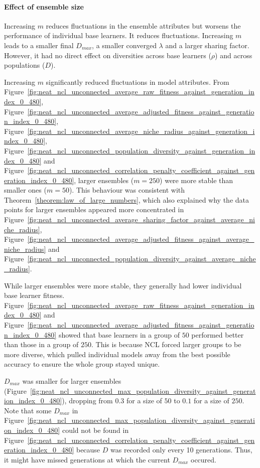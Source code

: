 \paragraph{Effect of ensemble size}
Increasing $m$ reduces fluctuations in the ensemble attributes but worsens the performance of individual base learners. It reduces fluctuations. Increasing $m$ leads to a smaller final $D_{max}$, a smaller converged $\lambda$ and a larger sharing factor. However, it had no direct effect on diversities across base learners ($\rho$) and across populations ($D$). 

Increasing $m$ significantly reduced fluctuations in model attributes. From Figure~\ref{fig:neat_ncl_unconnected_average_raw_fitness_against_generation_index_0_480}, Figure~\ref{fig:neat_ncl_unconnected_average_adjusted_fitness_against_generation_index_0_480}, Figure~\ref{fig:neat_ncl_unconnected_average_niche_radius_against_generation_index_0_480}, Figure~\ref{fig:neat_ncl_unconnected_population_diversity_against_generation_index_0_480} and Figure~\ref{fig:neat_ncl_unconnected_correlation_penalty_coefficient_against_generation_index_0_480}, larger ensembles ($m = 250$) were more stable than smaller ones ($m = 50$). This behaviour was consistent with Theorem~\ref{theorem:law_of_large_numbers}, which also explained why the data points for larger ensembles appeared more concentrated in Figure~\ref{fig:neat_ncl_unconnected_average_sharing_factor_against_average_niche_radius}, Figure~\ref{fig:neat_ncl_unconnected_average_adjusted_fitness_against_average_niche_radius} and Figure~\ref{fig:neat_ncl_unconnected_population_diversity_against_average_niche_radius}. 

While larger ensembles were more stable, they generally had lower individual base learner fitness. Figure~\ref{fig:neat_ncl_unconnected_average_raw_fitness_against_generation_index_0_480} and Figure~\ref{fig:neat_ncl_unconnected_average_adjusted_fitness_against_generation_index_0_480} showed that base learners in a group of $50$ performed better than those in a group of $250$. This is because NCL forced larger groups to be more diverse, which pulled individual models away from the best possible accuracy to ensure the whole group stayed unique. 

$D_{max}$ was smaller for larger ensembles (Figure~\ref{fig:neat_ncl_unconnected_max_population_diversity_against_generation_index_0_480}), dropping from $0.3$ for a size of $50$ to $0.1$ for a size of $250$. Note that some $D_{max}$ in Figure~\ref{fig:neat_ncl_unconnected_max_population_diversity_against_generation_index_0_480} could not be found in Figure~\ref{fig:neat_ncl_unconnected_correlation_penalty_coefficient_against_generation_index_0_480} because $D$ was recorded only every 10 generations. Thus, it might have missed generations at which the current $D_{max}$ occured. 

